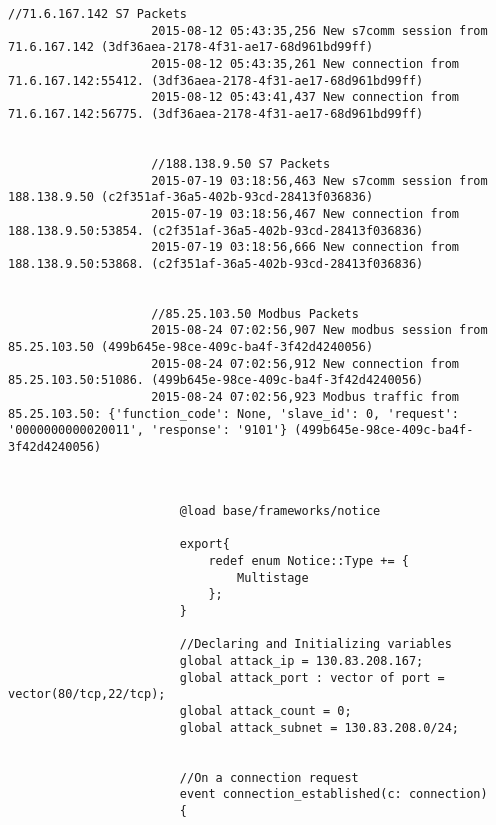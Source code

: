 \documentclass[article,msc=informatik,type=msc,colorback,accentcolor=tud9c]{tudthesis}
\begin{document}
\begin{appendix}
\begin{lstlisting}[caption=Packets received from Shodan Probes,label=lst:Packets received from Shodan Probes]
  	      			//71.6.167.142 S7 Packets
  	      			2015-08-12 05:43:35,256 New s7comm session from 71.6.167.142 (3df36aea-2178-4f31-ae17-68d961bd99ff)
  	      			2015-08-12 05:43:35,261 New connection from 71.6.167.142:55412. (3df36aea-2178-4f31-ae17-68d961bd99ff)
  	      			2015-08-12 05:43:41,437 New connection from 71.6.167.142:56775. (3df36aea-2178-4f31-ae17-68d961bd99ff)
  	      			
  	      			
  	      			//188.138.9.50 S7 Packets
  	      			2015-07-19 03:18:56,463 New s7comm session from 188.138.9.50 (c2f351af-36a5-402b-93cd-28413f036836)
  	      			2015-07-19 03:18:56,467 New connection from 188.138.9.50:53854. (c2f351af-36a5-402b-93cd-28413f036836)
  	      			2015-07-19 03:18:56,666 New connection from 188.138.9.50:53868. (c2f351af-36a5-402b-93cd-28413f036836)
  	      			
  	      			 
  	      			//85.25.103.50 Modbus Packets
  	      			2015-08-24 07:02:56,907 New modbus session from 85.25.103.50 (499b645e-98ce-409c-ba4f-3f42d4240056)
  	      			2015-08-24 07:02:56,912 New connection from 85.25.103.50:51086. (499b645e-98ce-409c-ba4f-3f42d4240056)
  	      			2015-08-24 07:02:56,923 Modbus traffic from 85.25.103.50: {'function_code': None, 'slave_id': 0, 'request': '0000000000020011', 'response': '9101'} (499b645e-98ce-409c-ba4f-3f42d4240056)
  	      			\end{lstlisting}
  	      			
  	      			\newpage
  	      			
  	      			\begin{lstlisting}[caption=Bro Policy for Multistage Attack detected by HosTaGE ICS,label=lst:Bro Policy for Multistage Attack detected by HosTaGE ICS ]
  	      				
  	      				
  	      				@load base/frameworks/notice
  	      				
  	      				export{
  	      					redef enum Notice::Type += {
  	      						Multistage
  	      					};
  	      				}
  	      				
  	      				//Declaring and Initializing variables
  	      				global attack_ip = 130.83.208.167;
  	      				global attack_port : vector of port = vector(80/tcp,22/tcp);
  	      				global attack_count = 0;
  	      				global attack_subnet = 130.83.208.0/24;
  	      				
  	      				
  	      				//On a connection request	
  	      				event connection_established(c: connection)
  	      				{
  	      				

\end{lstlisting}
\end{appendix}
\end{document}
